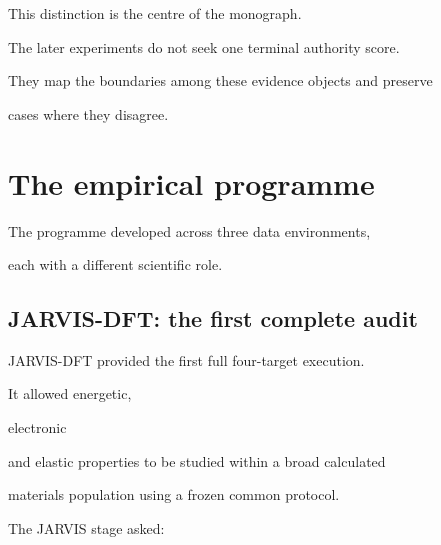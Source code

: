 \documentclass[11pt,a4paper,oneside]{report}
\begin{document}
This distinction is the centre of the monograph.



The later experiments do not seek one terminal authority score.



They map the boundaries among these evidence objects and preserve

cases where they disagree.



\section{The empirical programme}



The programme developed across three data environments,

each with a different scientific role.



\subsection{JARVIS-DFT: the first complete audit}



JARVIS-DFT provided the first full four-target execution.



It allowed energetic,

electronic

and elastic properties to be studied within a broad calculated

materials population using a frozen common protocol.



The JARVIS stage asked:
\end{document}
